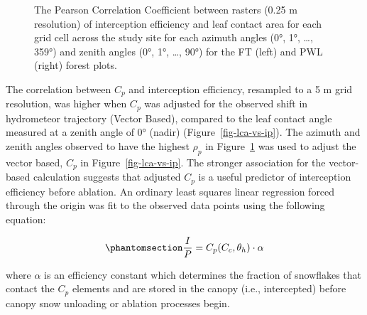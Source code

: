 \documentclass[
  letterpaper,
  DIV=11,
  numbers=noendperiod]{scrartcl}
\begin{document}
\begin{figure}[H]


\caption{\label{fig-hemi-ip-cc}The Pearson Correlation Coefficient
between rasters (0.25 m resolution) of interception efficiency and leaf
contact area for each grid cell across the study site for each azimuth
angles (0°, 1°, \ldots, 359°) and zenith angles (0°, 1°, \ldots, 90°)
for the FT (left) and PWL (right) forest plots.}

\end{figure}%

The correlation between \(C_p\) and interception efficiency, resampled
to a 5 m grid resolution, was higher when \(C_p\) was adjusted for the
observed shift in hydrometeor trajectory (Vector Based), compared to the
leaf contact angle measured at a zenith angle of 0° (nadir)
(Figure~\ref{fig-lca-vs-ip}). The azimuth and zenith angles observed to
have the highest \(\rho_p\) in Figure~\ref{fig-hemi-ip-cc} was used to
adjust the vector based, \(C_p\) in Figure~\ref{fig-lca-vs-ip}. The
stronger association for the vector-based calculation suggests that
adjusted \(C_p\) is a useful predictor of interception efficiency before
ablation. An ordinary least squares linear regression forced through the
origin was fit to the observed data points using the following equation:

\begin{equation}\phantomsection\label{eq-lca-ip}{
  \frac{I}{P} = C_p(C_c, \theta_h) \cdot \alpha
}\end{equation}

where \(\alpha\) is an efficiency constant which determines the fraction
of snowflakes that contact the \(C_p\) elements and are stored in the
canopy (i.e., intercepted) before canopy snow unloading or ablation
processes begin.
\end{document}
